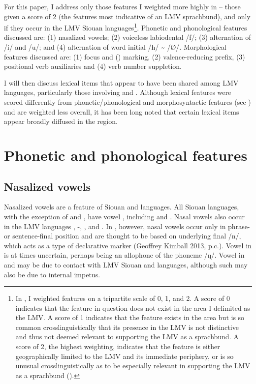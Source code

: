 \documentclass[output=paper]{LSP/langsci}
\begin{document}
For this paper, I address only those features I weighted more highly in \citet{Kaufman2014} -- those given a score of 2 (the features most indicative of an LMV sprachbund), and only if they occur in the LMV Siouan languages\footnote{In \citet{Kaufman2014}, I weighted features on a tripartite scale of 0, 1, and 2. A score of 0 indicates that the feature in question does not exist in the area I delimited as the LMV. A score of 1 indicates that the feature exists in the area but is so common crosslinguistically that its presence in the LMV is not distinctive and thus not deemed relevant to supporting the LMV as a sprachbund. A score of 2, the highest weighting, indicates that the feature is either geographically limited to the LMV and its immediate periphery, or is so unusual crosslinguistically as to be especially relevant in supporting the LMV as a sprachbund (\citealt{Kaufman2014}).}. Phonetic and phonological features discussed are: (1) nasalized vowels; (2) voiceless labiodental  /f/; (3) alternation of /i/ and /u/; and (4) alternation of word initial /h/ \textasciitilde{} /Ø/. Morphological features discussed are: (1) focus and  () marking, (2) valence-reducing prefix, (3) positional verb auxiliaries and (4) verb number suppletion. 

I will then discuss lexical items that appear to have been shared among LMV languages, particularly those involving  and . Although lexical features were scored differently from phonetic/phonological and morphosyntactic features (see \citealt{Kaufman2014}) and are weighted less overall, it has been long noted that certain lexical items appear broadly diffused in the region. 

\section{Phonetic and phonological features}

\subsection{Nasalized vowels}

Nasalized vowels are a feature of Siouan and  languages. All Siouan languages, with the exception of  and , have vowel , including  and . Nasal vowels also occur in the LMV languages , -, , and . In , however, nasal vowels occur only in phrase- or sentence-final position and are thought to be based on underlying final /n/, which acts as a type of declarative marker (Geoffrey Kimball 2013, p.c.). Vowel  in  is at times uncertain, perhaps being an allophone of the phoneme /ŋ/. Vowel  in  and  may be due to contact with LMV Siouan and  languages, although such  may also be due to internal impetus.
\end{document}
